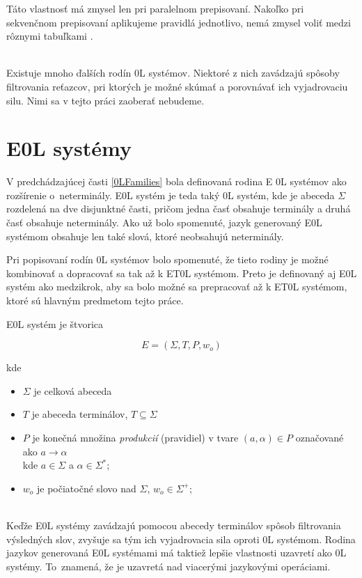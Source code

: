 Táto vlastnosť má zmysel len pri paralelnom prepisovaní. Nakoľko pri sekvenčnom prepisovaní aplikujeme pravidlá jednotlivo, nemá zmysel voliť medzi rôznymi tabuľkami \cite{handbook}.


\hfill\\
Existuje mnoho ďalších rodín 0L systémov. Niektoré z nich zavádzajú spôsoby filtrovania reťazcov, pri ktorých je možné skúmať a porovnávať ich vyjadrovaciu silu. Nimi sa v tejto práci zaoberať nebudeme. 


\section{E0L systémy}
V predchádzajúcej časti \ref{0LFamilies} bola definovaná rodina E 0L systémov ako rozšírenie o~neterminály. E0L systém je teda taký 0L systém, kde je abeceda $\Sigma$ rozdelená na dve disjunktné časti, pričom jedna časť obsahuje terminály a druhá časť obsahuje neterminály. Ako už bolo spomenuté, jazyk generovaný E0L systémom obsahuje len také slová, ktoré neobsahujú neterminály.

Pri popisovaní rodín 0L systémov bolo spomenuté, že tieto rodiny je možné kombinovať a dopracovať sa tak až k ET0L systémom. Preto je definovaný aj E0L systém ako medzikrok, aby sa bolo možné sa prepracovať až k ET0L systémom, ktoré sú hlavným predmetom tejto práce.


\begin{definition}
\label{E0LDefinition}

E0L systém je štvorica

\[ E = (\Sigma, T, P, w_o) \]

kde 

\begin{itemize}
    \itemsep0.2em 
    \item[] $\Sigma$ je celková abeceda
    \item[] $T$ je abeceda terminálov, $ T \subseteq \Sigma $
    \item[] $ P $ je konečná množina \textit{produkcií} (pravidiel) v tvare $ (a, \alpha) \in P $ označované ako $ a \to \alpha $  \\ kde $ a \in \Sigma $ a $ \alpha \in \Sigma^* $;
    \item[] $ w_o $ je počiatočné slovo nad $ \Sigma$, $w_o \in \Sigma^+ $;
\end{itemize}
\end{definition}
\hfill\\

Keďže E0L systémy zavádzajú pomocou abecedy terminálov spôsob filtrovania výsledných slov, zvyšuje sa tým ich vyjadrovacia sila oproti 0L systémom. Rodina jazykov generovaná E0L systémami má taktiež lepšie vlastnosti uzavretí ako 0L systémy. To~znamená, že je uzavretá nad viacerými jazykovými operáciami.

